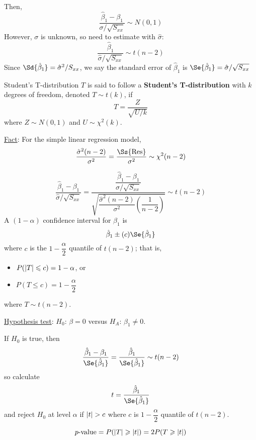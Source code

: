 Then,
\[ \frac{\hat{\beta}_1-\beta_1}{\sigma/\sqrt{S_{xx}}} \sim N(0,1)  \]
However, $ \sigma $ is unknown, so need to estimate
with $ \hat{\sigma} $:
\[ \frac{\hat{\beta}_1}{\hat{\sigma}/\sqrt{S_{xx}}}
    \sim t(n-2)  \]
Since $ \Sd{\hat{\beta}_1}=\hat{\sigma}^2/S_{xx} $,
we say the standard error of $ \hat{\beta}_1 $ is
$ \Se{\hat{\beta}_1}=\hat{\sigma}/\sqrt{S_{xx}} $
\begin{Definition}{Student's T-distribution}{}
    $ T $ is said to follow a \textbf{Student's T-distribution} with
    $ k $ degrees of freedom, denoted $ T \sim t(k) $, if
    \[ T=\frac{Z}{\sqrt{U/k}}  \]
    where $ Z \sim N(0,1) $ and $ U \sim \chi^2(k) $.
\end{Definition}

\underline{Fact}\@: For the simple linear regression model,
\[ \frac{\hat{\sigma}^2(n-2)}{\sigma^2}=\frac{\Ss{\text{Res}}}{\sigma^2}
    \sim \chi^2(n-2)  \]

\[ \frac{\hat{\beta}_1-\beta_1}{\hat{\sigma}/\sqrt{S_{xx}}}
    =\dfrac{\dfrac{\hat{\beta}_1-\beta_1}{\sigma/\sqrt{S_{xx}}}}{
        \sqrt{\dfrac{\hat{\sigma}^2(n-2)}{\sigma^2}\left( \dfrac{1}{n-2} \right)}
    } \sim t(n-2)  \]
A $ (1-\alpha) $ confidence interval for $ \beta_1 $ is
\[ \hat{\beta}_1\pm (c)\Se{\hat{\beta}_1} \]
where $ c $ is the $ 1-\dfrac{\alpha}{2} $ quantile
of $ t(n-2) $; that is,
\begin{itemize}
    \item $ P(\lvert T\rvert\leqslant c)=1-\alpha $, or
    \item $ P(T\leqslant c)=1-\dfrac{\alpha}{2} $
\end{itemize}
where $ T \sim t(n-2) $.

\underline{Hypothesis test}:
$ H_0 $: $ \beta=0 $ versus
$ H_A $: $ \beta_1\neq 0 $.

If $ H_0 $ is true, then
\[ \frac{\hat{\beta}_1-\beta_1}{\Se{\hat{\beta}_1}}
    =\frac{\hat{\beta}_1}{\Se{\hat{\beta}_1}} \sim t(n-2)  \]
so calculate
\[ t=\frac{\hat{\beta}_1}{\Se{\hat{\beta}_1}}  \]
and reject $ H_0 $ at level $ \alpha $ if $ \lvert t\rvert>c $
where $ c $ is $ 1-\dfrac{\alpha}{2} $ quantile of $ t(n-2) $.

\[ p\text{-value}=P(\lvert T\rvert\geqslant \lvert t\rvert)
    =2P(T\geqslant \lvert t\rvert) \]
